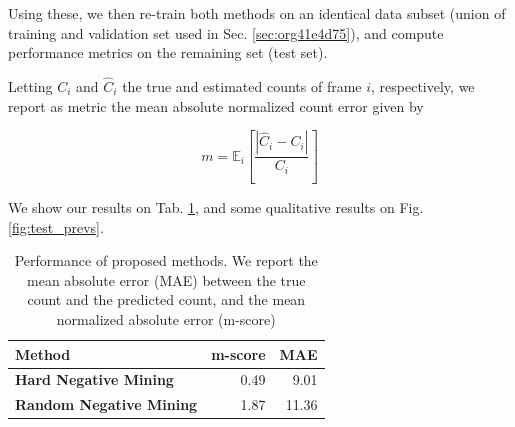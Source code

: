 \documentclass[11pt]{article}
\begin{document}
Using these, we then re-train both methods on an identical data subset (union of training and validation set used in Sec. \ref{sec:org41e4d75}), and compute performance metrics on the remaining set (test set).

Letting \(C_i\) and \(\hat{C}_i\) the true and estimated counts of frame \(i\), respectively, we report as metric the mean absolute normalized count error given by

\[
m = \mathbb{E}_i \left[ \frac{|\hat{C}_i - C_i|}{C_i} \right]
\]

We show our results on Tab. \ref{tab:org51ae428}, and some qualitative results on Fig. \ref{fig:test_prevs}.

\begin{table}[htbp]
\centering
\begin{tabular}{lrr}
Method & m-score & MAE\\
\hline
\textbf{Hard Negative Mining} & 0.49 & 9.01\\
\textbf{Random Negative Mining} & 1.87 & 11.36\\
\end{tabular}
\caption{\label{tab:org51ae428}Performance of proposed methods. We report the mean absolute error (MAE) between the true count and the predicted count, and the mean normalized absolute error (m-score)}

\end{table}
\end{document}
